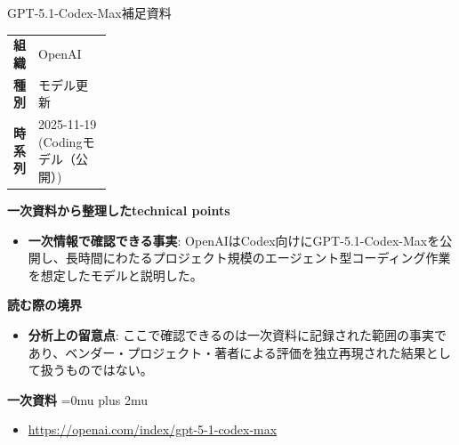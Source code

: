 \begin{technicalnote}{GPT-5.1-Codex-Max}{補足資料}
\begingroup
\begin{tabularx}{\linewidth}{@{}>{\bfseries}p{0.22\linewidth}X@{}}
組織 & OpenAI \\
種別 & モデル更新 \\
時系列 & 2025-11-19 (Codingモデル（公開）) \\
\end{tabularx}
\smallskip
{\bfseries 一次資料から整理したtechnical points}
\begin{itemize}[leftmargin=1.5em,itemsep=0.35em]
\item \textbf{一次情報で確認できる事実}: OpenAIはCodex向けにGPT-5.1-Codex-Maxを公開し、長時間にわたるプロジェクト規模のエージェント型コーディング作業を想定したモデルと説明した。
\end{itemize}
\begin{minipage}{\linewidth}
{\bfseries 読む際の境界}
\begin{itemize}[leftmargin=1.5em,itemsep=0.35em]
\item \textbf{分析上の留意点}: ここで確認できるのは一次資料に記録された範囲の事実であり、ベンダー・プロジェクト・著者による評価を独立再現された結果として扱うものではない。
\end{itemize}
\begin{samepage}
{\bfseries 一次資料}
\begingroup\sloppy
\Urlmuskip=0mu plus 2mu\relax
\begin{itemize}[leftmargin=1.5em,itemsep=0.25em]
\item {\scriptsize\url{https://openai.com/index/gpt-5-1-codex-max}}
\end{itemize}
\endgroup
\end{samepage}
\end{minipage}
\endgroup
\end{technicalnote}
\medskip

